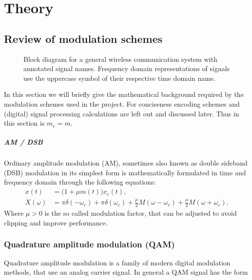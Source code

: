 
\chapter{Theory}

\section{Review of modulation schemes}

\begin{figure}
	\centering
	
	\caption{
		Block diagram for a general wireless communication system with annotated signal names.
		Frequency domain representations of signals use the uppercase symbol of their respective time domain name.
		\label{fig:notation}
	}
\end{figure}

In this section we will briefly give the mathematical background required by the modulation schemes used in the project. For conciseness encoding schemes and (digital) signal processing calculations are left out and discussed later. Thus in this section is \(m_e = m\).

\paragraph{AM / DSB}

Ordinary amplitude modulation (AM), sometimes also known as double sideband (DSB) modulation in its simplest form is mathematically formulated in time and frequency domain through the following equations\cite{Hsu}:
\begin{subequations}
	\begin{align}
		x(t) &= \big( 1 + \mu m(t) \big) x_c(t), \\
		X(\omega) &= \pi\delta(-\omega_c)
			+ \pi\delta(\omega_c)
			+ \frac{\mu}{2} M(\omega - \omega_c)
			+ \frac{\mu}{2} M(\omega + \omega_c).
	\end{align}
\end{subequations}
Where \(\mu > 0\) is the so called modulation factor, that can be adjusted to avoid clipping and improve performance.

\subsection{Quadrature amplitude modulation (QAM)}

Quadrature amplitude modulation is a family of modern digital modulation methods, that use an analog carrier signal. In general a QAM signal has the form

